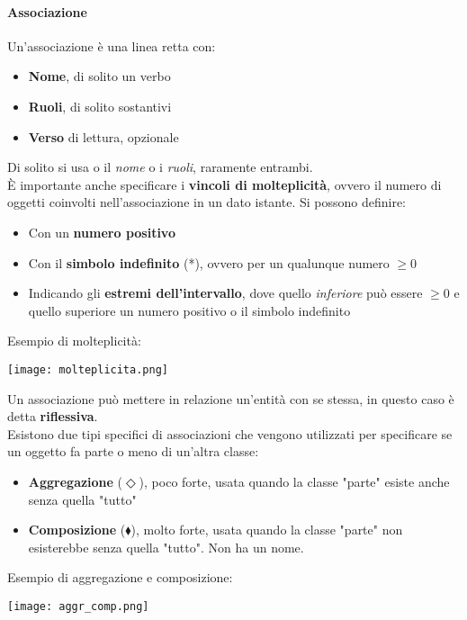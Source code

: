 \paragraph{Associazione}
Un'associazione è una linea retta con:
\begin{itemize}
	\item \textbf{Nome}, di solito un verbo
	\item \textbf{Ruoli}, di solito sostantivi
	\item \textbf{Verso} di lettura, opzionale
\end{itemize}
Di solito si usa o il \textit{nome} o i \textit{ruoli}, raramente entrambi. \\
È importante anche specificare i \textbf{vincoli di molteplicità}, ovvero il numero di oggetti coinvolti nell'associazione in un dato istante. Si possono definire:
\begin{itemize}
	\item Con un \textbf{numero positivo}
	\item Con il \textbf{simbolo indefinito} (*), ovvero per un qualunque numero $\geq 0$
	\item Indicando gli \textbf{estremi dell'intervallo}, dove quello \textit{inferiore} può essere $\geq 0$ e quello superiore un numero positivo o il simbolo indefinito
\end{itemize}
\begin{example}
	Esempio di molteplicità:
	\begin{center}
		\texttt{[image: molteplicita.png]}
	\end{center}
\end{example}
Un associazione può mettere in relazione un'entità con se stessa, in questo caso è detta \textbf{riflessiva}.\\
Esistono due tipi specifici di associazioni che vengono utilizzati per specificare se un oggetto fa parte o meno di un'altra classe:
\begin{itemize}
	\item \textbf{Aggregazione} ($\Diamond$), poco forte, usata quando la classe "parte" esiste anche senza quella "tutto"
	\item \textbf{Composizione} ($\mathbin{\blacklozenge}$), molto forte, usata quando la classe "parte" non esisterebbe senza quella "tutto". Non ha un nome.
\end{itemize}
\begin{example}
	Esempio di aggregazione e composizione:
	\begin{center}
		\texttt{[image: aggr\_comp.png]}
	\end{center}
\end{example}


